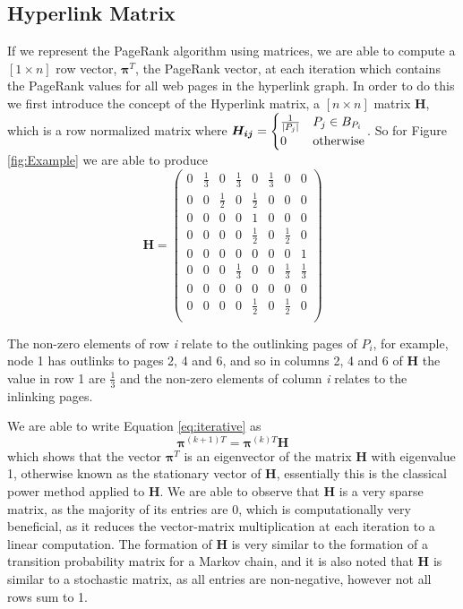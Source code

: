 \documentclass[11pt]{report}
\begin{document}
\subsection{Hyperlink Matrix} \label{sec:hyperlink}
If we represent the PageRank algorithm using matrices, we are able to compute a $ [1 \times \textit{n}]$ row vector, $\boldsymbol{\pi}^T$, the PageRank vector, at each iteration which contains the PageRank values for all web pages in the hyperlink graph. In order to do this we first introduce the concept of the Hyperlink matrix, a $[\textit{n}\times \textit{n}]$ matrix \textbf{H}, which is a row normalized matrix where 
\(\boldsymbol{H_{ij}} = \begin{cases} \frac{1}{\vert P_j \vert} & P_j\in B_{P_i } \\ 0 & \textnormal{otherwise} \end{cases}\). So for Figure \ref{fig:Example} we are able to produce 
\[\textbf{H}=\left(
\begin{array}{cccccccc}
0 & \frac{1}{3} & 0 & \frac{1}{3} & 0 &\frac{1}{3} & 0& 0 \\
0 & 0 &\frac{1}{2}& 0 &\frac{1}{2}& 0 & 0 & 0\\
0 & 0 & 0 & 0 & 1 & 0 & 0 & 0\\
0 & 0 & 0 & 0 & \frac{1}{2} & 0 & \frac{1}{2} & 0\\
0 & 0 & 0 & 0 & 0 & 0 & 0 & 1\\
0 & 0 & 0 & \frac{1}{3} & 0 & 0 & \frac{1}{3} & \frac{1}{3} \\
0 & 0 & 0 & 0 & 0 & 0 & 0 & 0\\
0 & 0 & 0 & 0 & \frac{1}{2} & 0 & \frac{1}{2} & 0\\
\end{array}
\right)	\]

The non-zero elements of row \textit{i} relate to the outlinking pages of $P_i$, for example, node 1 has outlinks to pages 2, 4 and 6, and so in columns 2, 4 and 6 of \textbf{H} the value in row 1 are $\frac{1}{3}$ and the non-zero elements of column \textit{i} relates to the inlinking pages.

We are able to write Equation \eqref{eq:iterative} as \begin{equation} \label{eq:power H}
\boldsymbol\pi^{(k+1)T} = \boldsymbol\pi^{(k)T}\textbf{H}
\end{equation}  which shows that the vector $\boldsymbol\pi^T$ is an eigenvector of the matrix \textbf{H} with eigenvalue 1, otherwise known as the stationary vector of \textbf{H}, essentially this is the classical power method applied to \textbf{H}. We are able to observe that \textbf{H} is a very sparse matrix, as the majority of its entries are 0, which is computationally very beneficial, as it reduces the vector-matrix multiplication at each iteration to a linear computation. The formation of \textbf{H} is very similar to the formation of a transition probability matrix for a Markov chain, and it is also noted that \textbf{H} is similar to a stochastic matrix, as all entries are non-negative, however not all rows sum to 1.
\end{document}
